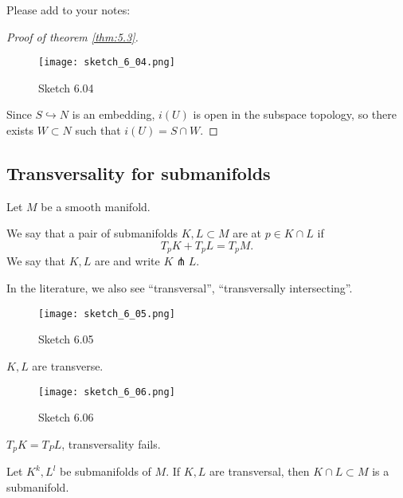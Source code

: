 Please add to your notes: %
\begin{proof}[Proof of theorem \ref{thm:5.3}]
    \begin{figure}[H]
        \centering
        \texttt{[image: sketch\_6\_04.png]}
        \caption{Sketch 6.04}
    \end{figure}
    
    Since \(S\hookrightarrow N\) is an embedding, \(i(U)\) is open in the 
    subspace topology, so there exists \(W\subset N\) such that \(i(U)=S\cap W\).

\end{proof}

\subsection{Transversality for submanifolds}

Let \(M\) be a smooth manifold. 
\begin{definition*}
    We say that a pair of submanifolds \(K,L\subset M\) are  at \(p\in K\cap L\) if 
    \[T_p K + T_p L = T_p M.\]
    We say that \(K,L\) are  and write \(K\pitchfork L\).
\end{definition*}

\begin{remark}
    In the literature, we  also see ``transversal'', ``transversally intersecting''. 
\end{remark}

\begin{example}
    \begin{figure}[H]
        \centering
        \texttt{[image: sketch\_6\_05.png]}
        \caption{Sketch 6.05}
    \end{figure}
    \(K,L\) are transverse.
    \begin{figure}[H]
        \centering
        \texttt{[image: sketch\_6\_06.png]}
        \caption{Sketch 6.06}
    \end{figure}
    \(T_p K=T_P L\), transversality fails.
\end{example}

\begin{lemma}\label{lem:6.1}
    Let \(K^k,L^l\) be submanifolds of \(M\). If \(K,L\) are transversal, then 
    \(K\cap L \subset M\) is a submanifold.
\end{lemma}

